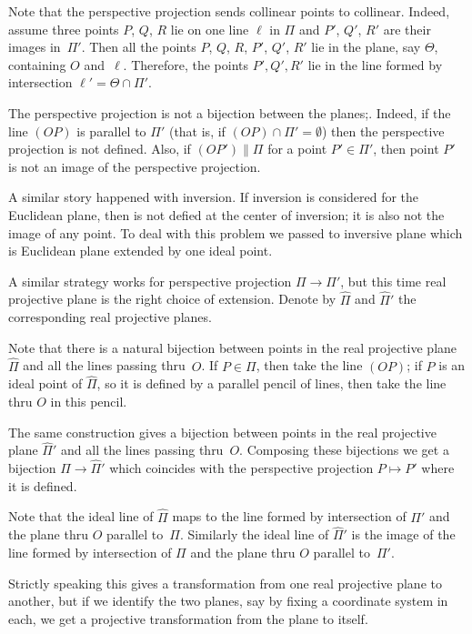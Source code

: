 Note that the perspective projection sends collinear points to collinear.
Indeed, assume three points $P$, $Q$, $R$ lie on one line $\ell$ in $\Pi$
and $P'$, $Q'$, $R'$ are their images in~$\Pi'$.
Then all the points $P$, $Q$, $R$, $P'$, $Q'$, $R'$ lie in the plane, say $\Theta$, containing $O$ and~$\ell$.
Therefore, the points $P',Q',R'$ lie in the line formed by intersection $\ell'=\Theta\cap \Pi'$.

The perspective projection is not a bijection between the planes;.
Indeed, if the line $(OP)$ is parallel to $\Pi'$ 
(that is, if $(OP)\cap\Pi'=\emptyset$)
then the perspective projection is not defined.
Also, if  $(OP')\parallel \Pi$ 
for a point $P'\in \Pi'$,
then point $P'$ is not an image of the perspective projection.

A similar story happened with inversion.
If inversion is considered for the Euclidean plane,
then is not defied at the center of inversion;
it is also not the image of any point.
To deal with this problem we passed to inversive plane 
which is Euclidean plane extended by one ideal point.

A similar strategy works for perspective projection $\Pi\to\Pi'$, but this time real projective plane is the right choice of extension.
Denote by $\hat \Pi$ and $\hat \Pi'$ 
the corresponding real projective planes.

Note that there is a natural bijection between points in the real projective plane $\hat \Pi$ and all the lines passing thru~$O$.
If $P\in \Pi$, then take the line $(OP)$;
if $P$ is an ideal point of $\hat \Pi$, so it is defined by a parallel pencil of lines, then take the line thru $O$  in this pencil. 

The same construction gives a bijection between points in the real projective plane $\hat \Pi'$ and all the lines passing thru~$O$.
Composing these bijections we get a bijection $\hat \Pi\to \hat \Pi'$ which coincides with the perspective projection $P\mapsto P'$
where it is defined.

Note that the ideal line of $\hat\Pi$ maps to the line formed by intersection of $\Pi'$ and the plane thru $O$ parallel to~$\Pi$.
Similarly the ideal line of $\hat\Pi'$
is the image of the line formed by intersection of $\Pi$ and the plane thru $O$ parallel to~$\Pi'$.

Strictly speaking this gives a transformation from one real projective plane to another, 
but if we identify the two planes, say by fixing a coordinate system in each, 
we get a projective transformation from the plane to itself. 

